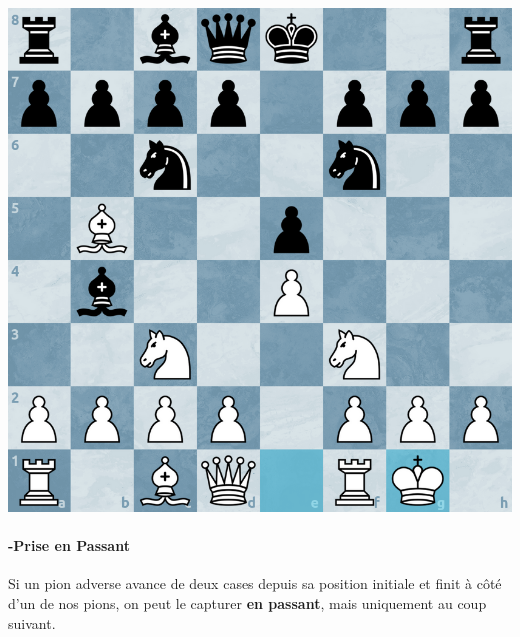 \documentclass{article}
\begin{document}
\begin{minipage}{0.48\textwidth}
    \centering
    \includegraphics[width=\textwidth, height=\textwidth]{roc2.png}
    \vspace{0.5cm}
\end{minipage}

\paragraph{-Prise en Passant} Si un pion adverse avance de deux cases depuis sa position initiale et finit à côté d’un de nos pions,
 on peut le capturer \textbf{en passant}, mais uniquement au coup suivant.
\end{document}

